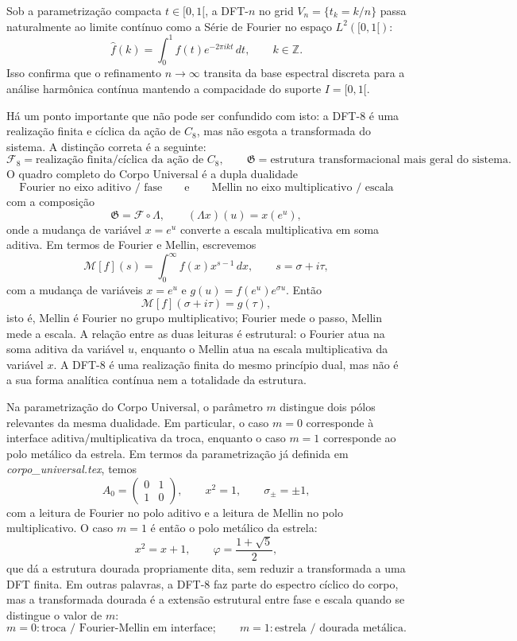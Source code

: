 \documentclass[11pt,a4paper]{article}
\begin{document}
Sob a parametrização compacta $t \in [0,1[$, a DFT-$n$ no grid $V_n = \{t_k = k/n\}$ passa naturalmente ao limite contínuo como a Série de Fourier no espaço $L^2([0,1[)$:
\[
\hat{f}(k) = \int_{0}^{1} f(t) e^{-2\pi i k t}\,dt, \qquad k \in \mathbb Z.
\]
Isso confirma que o refinamento $n \to \infty$ transita da base espectral discreta para a análise harmônica contínua mantendo a compacidade do suporte $I = [0,1[$.

Há um ponto importante que não pode ser confundido com isto: a DFT-8 é uma realização finita e cíclica da ação de $C_8$, mas não esgota a transformada do sistema. A distinção correta é a seguinte:
\[
\boxed{
\mathcal F_8=\text{realização finita/cíclica da ação de }C_8,
\qquad
\mathfrak G=\text{estrutura transformacional mais geral do sistema}.
}
\]
O quadro completo do Corpo Universal é a dupla dualidade
\[
\boxed{
\text{Fourier no eixo aditivo / fase}
\qquad\text{e}\qquad
\text{Mellin no eixo multiplicativo / escala}
}
\]
com a composição
\[
\boxed{
\mathfrak G = \mathcal F\circ \Lambda,
\qquad
(\Lambda x)(u)=x(e^u),
}
\]
onde a mudança de variável $x=e^u$ converte a escala multiplicativa em soma aditiva. Em termos de Fourier e Mellin, escrevemos
\[
\mathcal M[f](s)=\int_0^{\infty}f(x)x^{s-1}\,dx,
\qquad s=\sigma+i\tau,
\]
com a mudança de variáveis $x=e^u$ e $g(u)=f(e^u)e^{\sigma u}$. Então
\[
\mathcal M[f](\sigma+i\tau)=\widehat g(\tau),
\]
isto é, Mellin é Fourier no grupo multiplicativo; Fourier mede o passo, Mellin mede a escala. A relação entre as duas leituras é estrutural: o Fourier atua na soma aditiva da variável $u$, enquanto o Mellin atua na escala multiplicativa da variável $x$. A DFT-8 é uma realização finita do mesmo princípio dual, mas não é a sua forma analítica contínua nem a totalidade da estrutura.

Na parametrização do Corpo Universal, o parâmetro $m$ distingue dois pólos relevantes da mesma dualidade. Em particular, o caso $m=0$ corresponde à interface aditiva/multiplicativa da troca, enquanto o caso $m=1$ corresponde ao polo metálico da estrela. Em termos da parametrização já definida em \emph{corpo\_universal.tex}, temos
\[
\boxed{
A_0=
\begin{pmatrix}
0 & 1\\
1 & 0
\end{pmatrix},
\qquad x^2=1,
\qquad \sigma_{\pm}=\pm1,
}
\]
com a leitura de Fourier no polo aditivo e a leitura de Mellin no polo multiplicativo. O caso $m=1$ é então o polo metálico da estrela:
\[
\boxed{
x^2=x+1,
\qquad \varphi=\frac{1+\sqrt5}{2},
}
\]
que dá a estrutura dourada propriamente dita, sem reduzir a transformada a uma DFT finita. Em outras palavras, a DFT-8 faz parte do espectro cíclico do corpo, mas a transformada dourada é a extensão estrutural entre fase e escala quando se distingue o valor de $m$:
\[
\boxed{
 m=0: \text{troca / Fourier-Mellin em interface};
\qquad
 m=1: \text{estrela / dourada metálica}.
}
\]
\end{document}
